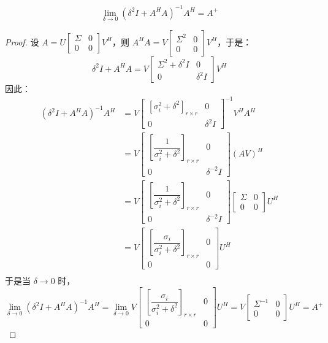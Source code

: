 \begin{theorem}
\[
    \lim_{\delta\to0}(\delta^2I+A^HA)^{-1}A^H=A^+
\]
\end{theorem}
\begin{proof}
设 $A=U\begin{bmatrix}\Sigma&0\\0&0\end{bmatrix}V^H$，则 $A^HA=V\begin{bmatrix}\Sigma^2&0\\0&0\end{bmatrix}V^H$，于是：
\[\delta^2I+A^HA=V\begin{bmatrix}\Sigma^2+\delta^2I&0\\0&\delta^2I\end{bmatrix}V^H\]
因此：
\begin{align*}
    (\delta^2I+A^HA)^{-1}A^H&=V\begin{bmatrix}\left[\sigma_i^2+\delta^2\right]_{r\times r}&0\\0&\delta^2I\end{bmatrix}^{-1}V^HA^H\\
    &=V\begin{bmatrix}\left[\dfrac{1}{\sigma_i^2+\delta^2}\right]_{r\times r}&0\\0&\delta^{-2}I\end{bmatrix}(AV)^H\\
    &=V\begin{bmatrix}\left[\dfrac{1}{\sigma_i^2+\delta^2}\right]_{r\times r}&0\\0&\delta^{-2}I\end{bmatrix}\begin{bmatrix}\Sigma&0\\0&0\end{bmatrix}U^H\\
    &=V\begin{bmatrix}\left[\dfrac{\sigma_i}{\sigma_i^2+\delta^2}\right]_{r\times r}&0\\0&0\end{bmatrix}U^H\\
\end{align*}
于是当 $\delta\to0$ 时，
\[
\lim_{\delta\to0}(\delta^2I+A^HA)^{-1}A^H=\lim_{\delta\to0}V\begin{bmatrix}\left[\dfrac{\sigma_i}{\sigma_i^2+\delta^2}\right]_{r\times r}&0\\0&0\end{bmatrix}U^H=V\begin{bmatrix}\Sigma^{-1}&0\\0&0\end{bmatrix}U^H=A^+
\]
\end{proof}


